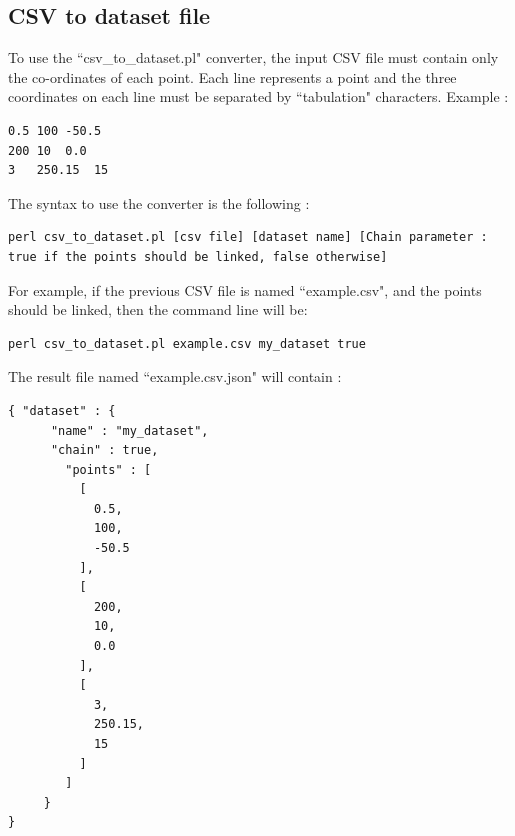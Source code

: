 \documentclass{bioinfo}
\begin{document}
\subsection{CSV to dataset file}
To use the ``csv\_to\_dataset.pl" converter, the input CSV file must contain only the co-ordinates of each point. Each line represents a point and the three coordinates on each line must be separated by ``tabulation" characters. Example :
\begin{lstlisting}
0.5	100	-50.5
200	10	0.0
3	250.15	15
\end{lstlisting}
The syntax to use the converter is the following :
\begin{lstlisting}
perl csv_to_dataset.pl [csv file] [dataset name] [Chain parameter : true if the points should be linked, false otherwise]
\end{lstlisting}
For example, if the previous CSV file is named ``example.csv", and the points should be linked, then the command line will be:
\begin{lstlisting}
perl csv_to_dataset.pl example.csv my_dataset true
\end{lstlisting}
The result file named ``example.csv.json" will contain :
\begin{lstlisting}
{ "dataset" : {
      "name" : "my_dataset",
      "chain" : true,
        "points" : [
          [
            0.5,
            100,
            -50.5
          ],
          [
            200,
            10,
            0.0
          ],
          [
            3,
            250.15,
            15
          ]
        ]
     }
}
\end{lstlisting}
\end{document}
